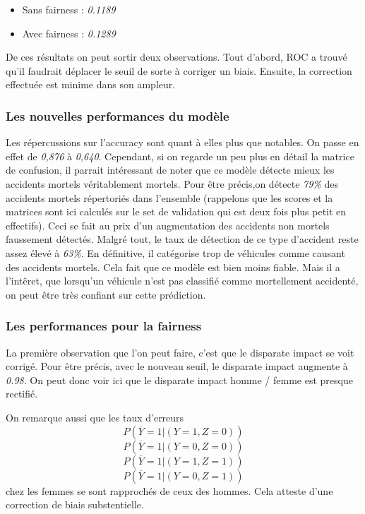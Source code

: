 \documentclass{article}
\begin{document}
    \begin{itemize}
        \item Sans fairness : \textit{0.1189}
        \item Avec fairness : \textit{0.1289}
    \end{itemize}
    
    De ces résultats on peut sortir deux observations. Tout d'abord, ROC a trouvé qu'il faudrait déplacer le seuil de sorte à corriger 
    un biais. Ensuite, la correction effectuée est minime dans son ampleur. 

    \subsubsection{Les nouvelles performances du modèle}

    Les répercussions sur l'accuracy sont quant à elles plus que notables. On passe en effet de \textit{0,876} à \textit{0,640}.
    Cependant, si on regarde un peu plus en détail la matrice de confusion, il parrait intéressant de noter que ce modèle détecte mieux 
    les accidents mortels véritablement mortels. Pour être précis,on détecte \textit{79\%} des accidents
    mortels répertoriés dans l'ensemble (rappelons que les scores et la matrices sont ici calculés sur le set de validation qui est deux fois plus petit en effectifs). 
    Ceci se fait au prix d'un augmentation des accidents non mortels faussement détectés. Malgré tout, 
    le taux de détection de ce type d'accident reste assez élevé à \textit{63\%}. En définitive, il catégorise trop de véhicules comme causant des accidents mortels.
    Cela fait que ce modèle est bien moins fiable. Mais il a l'intêret, que lorsqu'un véhicule n'est pas classifié comme mortellement accidenté, 
    on peut être très confiant sur cette prédiction. 

    \subsubsection{Les performances pour la fairness}

    La première observation que l'on peut faire, c'est que le disparate impact se voit corrigé. Pour être précis, avec le nouveau seuil, le disparate impact
    augmente à \textit{0.98}. On peut donc voir ici que le disparate impact homme / femme est presque rectifié. 
    
    On remarque aussi que les taux d'erreurs 
    \[ P(\overline{Y}=1| (Y=1, Z=0)) \] \[ P(\overline{Y}=1| (Y=0, Z=0)) \] \[ P(\overline{Y}=1| (Y=1, Z=1)) \] \[ P(\overline{Y}=1| (Y=0, Z=1)) \] chez les femmes se sont rapprochés de
    ceux des hommes. Cela atteste d'une correction de biais substentielle.  
\end{document}

